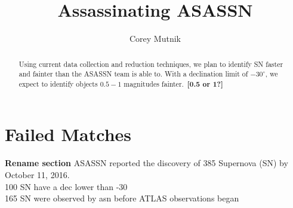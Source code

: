 \documentclass[aps,prb,twocolumn,superscriptaddress]{revtex4-1}
\begin{document}
\title{Assassinating ASASSN}


\author{Corey Mutnik}

\begin{abstract}
Using current data collection and reduction techniques, we plan to 
identify SN faster and fainter than the ASASSN team is able to. With 
a declination limit of $-30^{\circ}$, we expect to identify objects 
$0.5-1$ magnitudes fainter.~\bf{[0.5 or 1?]}
\end{abstract}

\maketitle    

\section{Failed Matches}
{\bf Rename section}
\iffalse
 ASASSN reported the discovery of 385 Supernova (SN) by October 11, 2016. \\
 100 SN have a dec lower than -30\\
 165 SN were observed by asn before ATLAS observations began\\
\end{document}
